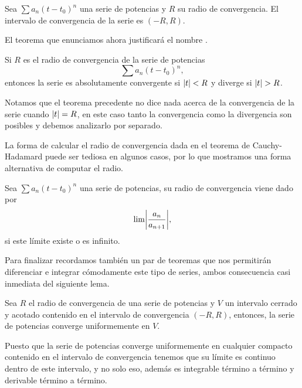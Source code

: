 \documentclass[../ecuaciones_diferenciales.tex]{subfiles}
\begin{document}
\begin{definition}
	Sea \(\sum a_n {(t - t_0)}^n\) una serie de potencias y \(R\) su radio de
	convergencia. El intervalo de convergencia de la serie es \((-R, R)\).
\end{definition}

El teorema que enunciamos ahora justificará el nombre .

\begin{theorem}
	Si \(R\) es el radio de convergencia de la serie de potencias 
	\[\sum a_n {(t - t_0)}^n,\] 
	entonces la serie es absolutamente convergente si 
	\(\abs{t} < R\) y diverge si \(\abs{t} > R\).
\end{theorem}

\begin{remark}
	Notamos que el teorema precedente no dice nada acerca de la convergencia de
	la serie cuando \(\abs{t} = R\), en este caso tanto la convergencia como la
	divergencia son posibles y debemos analizarlo por separado.
\end{remark}

La forma de calcular el radio de convergencia dada en el teorema de
Cauchy-Hadamard puede ser tediosa en algunos casos, por lo que mostramos una
forma alternativa de computar el radio.

\begin{lemma}
	Sea \(\sum a_n {(t - t_0)}^n\) una serie de potencias, su radio de
	convergencia viene dado por
	\[\lim\abs{\frac{a_n}{a_{n + 1}}},\]
	si este límite existe o es infinito.
\end{lemma}

Para finalizar recordamos también un par de teoremas que nos permitirán
diferenciar e integrar cómodamente este tipo de series, ambos consecuencia casi
inmediata del siguiente lema.

\begin{lemma}
	Sea \(R\) el radio de convergencia de una serie de potencias y \(V\) un
	intervalo cerrado y acotado contenido en el intervalo de convergencia 
	\((-R, R)\), entonces, la serie de potencias converge uniformemente en
	\(V\).
\end{lemma}

Puesto que la serie de potencias converge uniformemente en cualquier compacto
contenido en el intervalo de convergencia tenemos que su límite es continuo
dentro de este intervalo, y no solo eso, además es integrable término a
término y derivable término a término.
\end{document}
